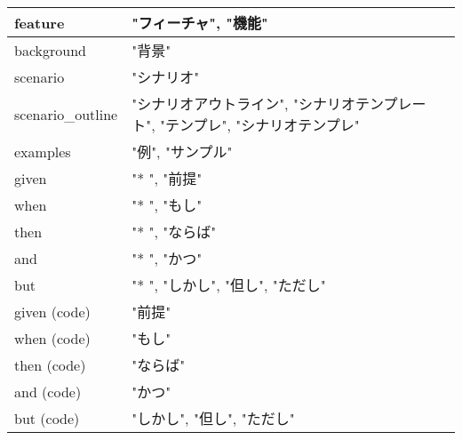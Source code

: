 \begin{table}[htbp]\begin{center}
\caption{}
\begin{tabular}{lll}
\hline
feature  &"フィーチャ", "機能"     \\ \hline
background  &"背景"              \\
scenario  &"シナリオ"            \\
scenario\_outline   &"シナリオアウトライン", "シナリオテンプレート", "テンプレ", "シナリオテンプレ"   \\
examples  &"例", "サンプル"       \\
given   &"* ", "前提"        \\
when   &"* ", "もし"        \\
then   &"* ", "ならば"       \\
and    &"* ", "かつ"        \\
but    &"* ", "しかし", "但し", "ただし"  \\
given (code)   &"前提"              \\
when (code)   &"もし"              \\
then (code)   &"ならば"             \\
and (code)    &"かつ"              \\
but (code)    &"しかし", "但し", "ただし"   \\
\hline
\end{tabular}
\label{default}
\end{center}\end{table}

